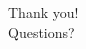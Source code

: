 \documentclass[10pt]{beamer}
\begin{document}
\begin{frame}[standout]
  \LARGE Thank you!\\
  \vspace{1cm}
  \LARGE Questions?
\end{frame}

\end{document}

